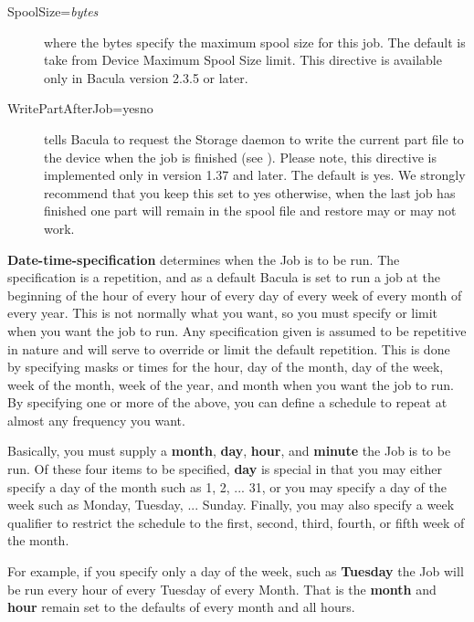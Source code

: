 \begin{description}
\begin{description}
\item [SpoolSize={\it bytes}]
   where the bytes specify the maximum spool size for this job.
   The default is take from Device Maximum Spool Size limit. 
   This directive is available only in Bacula version 2.3.5 or 
   later.

\item [WritePartAfterJob=yes\vb{}no]
   tells Bacula to request the Storage daemon to write the current part
   file to the device when the job is finished (see ).  Please note,
   this directive is implemented only in version 1.37 and later.  The
   default is yes.  We strongly recommend that you keep this set to yes
   otherwise, when the last job has finished one part will remain in the
   spool file and restore may or may not work.

\end{description}

{\bf Date-time-specification} determines when the  Job is to be run. The
specification is a repetition, and as  a default Bacula is set to run a job at
the beginning of the  hour of every hour of every day of every week of every
month  of every year. This is not normally what you want, so you  must specify
or limit when you want the job to run. Any  specification given is assumed to
be repetitive in nature and  will serve to override or limit the default
repetition. This  is done by specifying masks or times for the hour, day of the
month, day of the week, week of the month, week of the year,  and month when
you want the job to run. By specifying one or  more of the above, you can
define a schedule to repeat at  almost any frequency you want.  

Basically, you must supply a {\bf month}, {\bf day}, {\bf hour}, and  {\bf
minute} the Job is to be run. Of these four items to be specified,  {\bf day}
is special in that you may either specify a day of the month  such as 1, 2,
... 31, or you may specify a day of the week such  as Monday, Tuesday, ...
Sunday. Finally, you may also specify a  week qualifier to restrict the
schedule to the first, second, third,  fourth, or fifth week of the month.  

For example, if you specify only a day of the week, such as {\bf Tuesday}  the
Job will be run every hour of every Tuesday of every Month. That  is the {\bf
month} and {\bf hour} remain set to the defaults of  every month and all
hours.  


\end{description}
